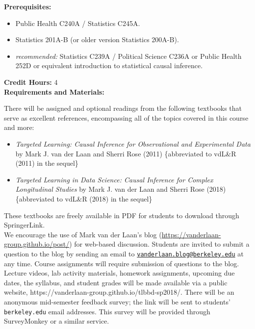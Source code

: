 \documentclass[11pt]{article}
\begin{document}
\newpage

\textbf {Prerequisites:}
\begin{itemize} \itemsep-0.5em
  \item Public Health C240A / Statistics C245A.
  \item Statistics 201A-B (or older version Statistics 200A-B).
  \item \textit{recommended:} Statistics C239A / Political Science C236A or
    Public Health 252D or equivalent introduction to statistical causal
    inference.
\end{itemize}

\textbf {Credit Hours:} 4 \\

\textbf {\large Requirements and Materials:}

There will be assigned and optional readings from the following textbooks that
serve as excellent references, encompassing all of the topics covered in this
course and more:
\begin{itemize}
  \item \textit{Targeted Learning: Causal Inference for Observational and
    Experimental Data} by Mark J. van der Laan and Sherri Rose (2011)
    \{abbreviated to vdL\&R (2011) in the sequel\}
  \item \textit{Targeted Learning in Data Science: Causal Inference for Complex
    Longitudinal Studies} by Mark J. van der Laan and Sherri Rose (2018)
    \{abbreviated to vdL\&R (2018) in the sequel\}
\end{itemize}

These textbooks are freely available in PDF for students to download through
SpringerLink. \\

We encourage the use of Mark van der Laan's blog
(\url{https://vanderlaan-group.github.io/post/}) for web-based discussion.
Students are invited to submit a question to the blog by sending an email to
\href{mailto:vanderlaan.blog@berkeley.edu}{
\texttt{vanderlaan.blog@berkeley.edu}} at any time. Course assignments will
require submission of questions to the blog. \\

Lecture videos, lab activity materials, homework assignments, upcoming due
dates, the syllabus, and student grades will be made available via a
public website, https://vanderlaan-group.github.io/tlbbd-sp2018/. There will be
an anonymous mid-semester feedback survey; the link will be sent to students'
\texttt{berkeley.edu} email addresses. This survey will be provided through
SurveyMonkey or a similar service. \\
\end{document}
